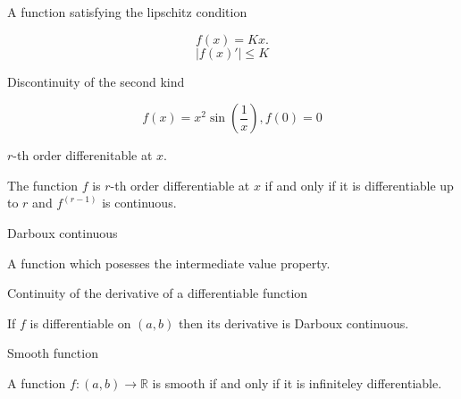 \begin{flashcard}[Example]{A function satisfying the lipschitz condition}

    $$f(x)  = Kx.$$
    $$|f(x)'| \leq K$$

\end{flashcard}


\begin{flashcard}[Example]{Discontinuity of the second kind}

    $$f(x) = x^2\sin\left(\frac{1}{x}\right), f(0) = 0 $$

\end{flashcard}

\begin{flashcard}[Definition]{$r$-th order differenitable at $x.$}

    The function $f$ is $r$-th order differentiable at $x$ if and only if it is differentiable up to $r$ and $f^{(r-1)}$ is continuous.

\end{flashcard}


\begin{flashcard}[Definition]{Darboux continuous}

    A function which posesses the intermediate value property.

\end{flashcard}

\begin{flashcard}[Theorem]{Continuity of the derivative of a differentiable function}

    If $f$ is differentiable on $(a,b)$ then its derivative is Darboux continuous.

\end{flashcard}

\begin{flashcard}[Definition]{Smooth function}

    A function $f: (a,b) \to \mathbb{R}$ is smooth if and only if it is infiniteley differentiable.

\end{flashcard}

